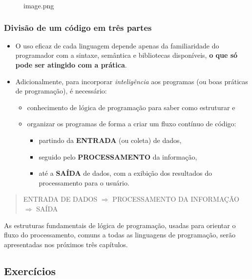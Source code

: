 \documentclass[12pt,a4paper]{article}
\providecommand{\tightlist}{%
      \setlength{\itemsep}{0pt}\setlength{\parskip}{0pt}}
\begin{document}
    \begin{figure}
\centering
\caption{image.png}
\end{figure}

    \hypertarget{divisuxe3o-de-um-cuxf3digo-em-truxeas-partes}{%
\subsubsection{Divisão de um código em três
partes}\label{divisuxe3o-de-um-cuxf3digo-em-truxeas-partes}}

    \begin{itemize}
\item
  O uso eficaz de cada linguagem depende apenas da familiaridade do
  programador com a sintaxe, semântica e bibliotecas disponíveis,
  \textbf{o que só pode ser atingido com a prática}.
\item
  Adicionalmente, para incorporar \emph{inteligência} aos programas (ou
  boas práticas de programação), é necessário:

  \begin{itemize}
  \tightlist
  \item
    conhecimento de lógica de programação para saber como estruturar e
  \item
    organizar os programas de forma a criar um fluxo contínuo de código:

    \begin{itemize}
    \tightlist
    \item
      partindo da \textbf{ENTRADA} (ou coleta) de dados,
    \item
      seguido pelo \textbf{PROCESSAMENTO} da informação,
    \item
      até a \textbf{SAÍDA} de dados, com a exibição dos resultados do
      processamento para o usuário.
    \end{itemize}
  \end{itemize}
\end{itemize}

\begin{quote}
ENTRADA DE DADOS \(\Rightarrow\) PROCESSAMENTO DA INFORMAÇÃO
\(\Rightarrow\) SAÍDA
\end{quote}

    As estruturas fundamentais de lógica de programação, usadas para
orientar o fluxo do processamento, comuns a todas as linguagens de
programação, serão apresentadas nos próximos três capítulos.

    \hypertarget{exercuxedcios}{%
\subsection{Exercícios}\label{exercuxedcios}}
\end{document}
